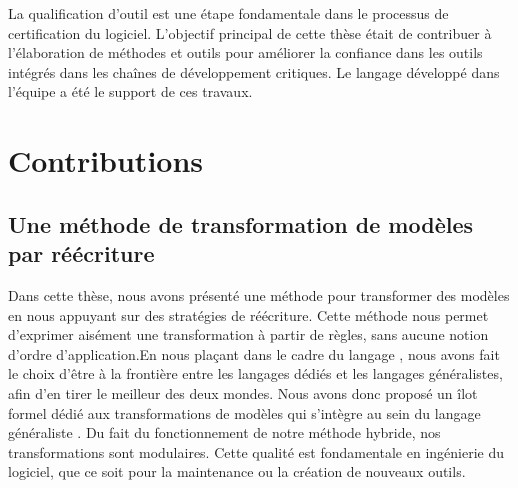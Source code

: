 \cleardoublepage
{}
{}
\label{ch:conclusion}


%
%
%
%

La qualification d'outil est une étape fondamentale dans le processus de
certification du logiciel. L'objectif principal de cette thèse était de
contribuer à l'élaboration de méthodes et outils pour améliorer la confiance
dans les outils intégrés dans les chaînes de développement critiques. Le
langage {\tom} développé dans l'équipe a été le support de ces travaux.

\section*{Contributions}

\subsection*{Une méthode de transformation de modèles par réécriture}

Dans cette thèse, nous avons présenté une méthode pour transformer des modèles
en nous appuyant sur des stratégies de réécriture. Cette méthode nous permet
d'exprimer aisément une transformation à partir de règles, sans aucune notion
d'ordre d'application.En nous plaçant dans le cadre du langage {\tom}, nous
avons fait le choix d'être à la frontière entre les langages dédiés et les
langages généralistes, afin d'en tirer le meilleur des deux mondes. Nous avons
donc proposé un îlot formel dédié aux transformations de modèles qui s'intègre
au sein du langage généraliste {\java}. Du fait du fonctionnement de notre
méthode hybride, nos transformations sont modulaires. Cette qualité est
fondamentale en ingénierie du logiciel, que ce soit pour la maintenance ou la
création de nouveaux outils.

